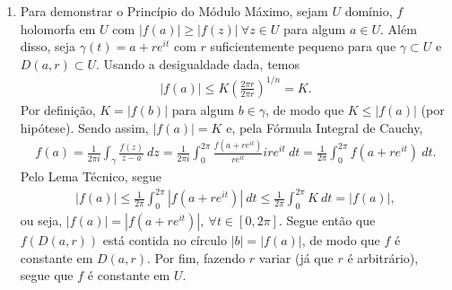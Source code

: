 \documentclass[12pt,a4paper]{article}
\begin{document}
\begin{enumerate}
		\item Para demonstrar o Princípio do Módulo Máximo, sejam $U$ domínio, $f$ holomorfa em $U$ com $|f(a)|\geq|f(z)| \ \forall z\in U$ para algum $a\in U$. Além disso, seja $\gamma(t) = a + re^{it}$ com $r$ suficientemente pequeno para que $\gamma \subset U$ e $D(a,r)\subset U$. Usando a desigualdade dada, temos
		\begin{align*}
		|f(a)| \leq K\left( \frac{2\pi r}{2\pi r} \right)^{1/n} = K.
		\end{align*}
		Por definição, $K = |f(b)|$ para algum $b\in\gamma$, de modo que $K\leq |f(a)|$ (por hipótese). Sendo assim, $|f(a)| = K$ e, pela Fórmula Integral de Cauchy,
		\begin{align*}
		f(a) = \frac{1}{2\pi i}\int_{\gamma}\frac{f(z)}{z-a} \ dz = \frac{1}{2\pi i}\int_{0}^{2\pi}\frac{f(a+re^{it})}{re^{it}}ire^{it} \ dt = \frac{1}{2\pi}\int_{0}^{2\pi}f(a+re^{it}) \ dt.
		\end{align*}
		Pelo Lema Técnico, segue
		\begin{align*}
		|f(a)|\leq \frac{1}{2\pi}\int_{0}^{2\pi}|f(a+re^{it})| \ dt \leq \frac{1}{2\pi}\int_{0}^{2\pi}K \ dt = |f(a)|,
		\end{align*}
		ou seja, $|f(a)| = |f(a+re^{it})|, \ \forall t\in [0,2\pi]$. Segue então que $f(D(a,r))$ está contida no círculo $|b| = |f(a)|$, de modo que $f$ é constante em $D(a,r)$. Por fim, fazendo $r$ variar (já que $r$ é arbitrário), segue que $f$ é constante em $U$.
		

\end{enumerate}
\end{document}
